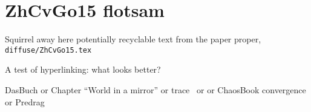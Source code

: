 
\section{ZhCvGo15 flotsam}
\label{s:flotsam}

Squirrel away here potentially recyclable text from the
paper proper, \texttt{diffuse/ZhCvGo15.tex}




A test of hyperlinking: what looks better?

DasBuch
or
 {Chapter ``{World} in a mirror''}
or trace~
or 
or ChaosBook convergence
or Predrag
